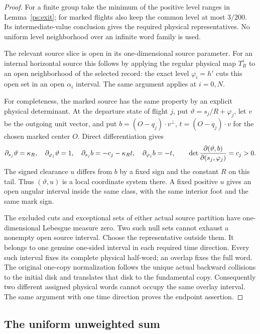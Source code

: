 \begin{proof}
For a finite group take the minimum of the positive level ranges
in Lemma~\ref{ps:exit}; for marked flights also keep the common
level at most $3/200$.  Its intermediate-value conclusion gives
the required physical representatives.  No uniform level
neighborhood over an infinite word family is used.

The relevant source slice is open in its one-dimensional source
parameter.  For an internal horizontal source this follows by
applying the regular physical map $T_R^i$ to an open neighborhood
of the selected record: the exact level $\varphi_i=h'$ cuts this
open set in an open $\alpha_i$ interval.  The same argument applies
at $i=0,N$.

For completeness, the marked source has the same property by an
explicit physical determinant.  At the departure state of flight
$j$, put $\vartheta=s_j/R+\varphi_j$, let $v$ be the outgoing
unit vector, and put
$b=(O-q_j)\cdot v^\perp$, $t=(O-q_j)\cdot v$ for the chosen
marked center $O$.  Direct differentiation gives
\[
 \partial_{s_j}\vartheta=\kappa_R,\quad
 \partial_{\varphi_j}\vartheta=1,\quad
 \partial_{s_j}b=-c_j-\kappa_R t,\quad
 \partial_{\varphi_j}b=-t,
 \qquad
 \det{\partial(\vartheta,b)\over\partial(s_j,\varphi_j)}=c_j>0.
\]
The signed clearance $u$ differs from $b$ by a fixed sign and the
constant $R$ on this tail.  Thus $(\vartheta,u)$ is a local
coordinate system there.  A fixed positive $u$ gives an open
angular interval inside the same class, with the same interior
foot and the same mark sign.

The excluded cuts and exceptional sets of either actual source
partition have one-dimensional Lebesgue measure zero.  Two such
null sets cannot exhaust a nonempty open source interval.
Choose the representative outside them.  It belongs to one
genuine one-sided interval in each required time direction.
Every such interval fixes its complete physical half-word;
an overlap fixes the full word.  The original one-copy
normalization follows the unique actual backward collisions to
the initial disk and translates that disk to the fundamental
copy.  Consequently two different assigned physical words
cannot occupy the same overlay interval.  The same argument with
one time direction proves the endpoint assertion.
\end{proof}

\subsection{The uniform unweighted sum}

